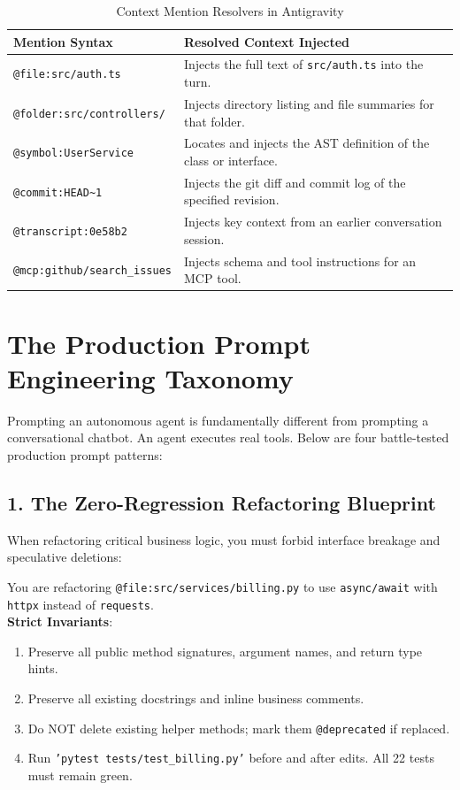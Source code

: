 \documentclass[11pt,a4paper,oneside]{book}
\begin{document}
\begin{table}[htbp]
\centering
\caption{Context Mention Resolvers in Antigravity}
\begin{tabularx}{\textwidth}{lX}
\toprule
\textbf{Mention Syntax} & \textbf{Resolved Context Injected} \\
\midrule
\texttt{@file:src/auth.ts} & Injects the full text of \texttt{src/auth.ts} into the turn. \\
\texttt{@folder:src/controllers/} & Injects directory listing and file summaries for that folder. \\
\texttt{@symbol:UserService} & Locates and injects the AST definition of the class or interface. \\
\texttt{@commit:HEAD\textasciitilde1} & Injects the git diff and commit log of the specified revision. \\
\texttt{@transcript:0e58b2} & Injects key context from an earlier conversation session. \\
\texttt{@mcp:github/search\_issues} & Injects schema and tool instructions for an MCP tool. \\
\bottomrule
\end{tabularx}
\end{table}

\section{The Production Prompt Engineering Taxonomy}
Prompting an autonomous agent is fundamentally different from prompting a conversational chatbot. An agent executes real tools. Below are four battle-tested production prompt patterns:

\subsection{1. The Zero-Regression Refactoring Blueprint}
When refactoring critical business logic, you must forbid interface breakage and speculative deletions:

\begin{promptbox}
You are refactoring \texttt{@file:src/services/billing.py} to use \texttt{async/await} with \texttt{httpx} instead of \texttt{requests}.\\
\textbf{Strict Invariants}:
\begin{enumerate}
    \item Preserve all public method signatures, argument names, and return type hints.
    \item Preserve all existing docstrings and inline business comments.
    \item Do NOT delete existing helper methods; mark them \texttt{@deprecated} if replaced.
    \item Run \texttt{'pytest tests/test\_billing.py'} before and after edits. All 22 tests must remain green.
\end{enumerate}
\end{promptbox}
\end{document}
